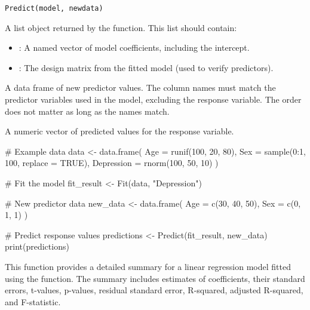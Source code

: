 \documentclass[a4paper]{book}
\begin{document}
%
\begin{Usage}
\begin{verbatim}
Predict(model, newdata)
\end{verbatim}
\end{Usage}
%
\begin{Arguments}
\begin{ldescription}
\item[\code{model}] A list object returned by the  function. This list should contain:
\begin{itemize}

\item{} : A named vector of model coefficients, including the intercept.
\item{} : The design matrix from the fitted model (used to verify predictors).

\end{itemize}


\item[\code{newdata}] A data frame of new predictor values. The column names must match the predictor variables
used in the model, excluding the response variable. The order does not matter as long as the names match.
\end{ldescription}
\end{Arguments}
%
\begin{Value}
A numeric vector of predicted values for the response variable.
\end{Value}
%
\begin{Examples}
\begin{ExampleCode}
# Example data
data <- data.frame(
  Age = runif(100, 20, 80),
  Sex = sample(0:1, 100, replace = TRUE),
  Depression = rnorm(100, 50, 10)
)

# Fit the model
fit_result <- Fit(data, "Depression")

# New predictor data
new_data <- data.frame(
  Age = c(30, 40, 50),
  Sex = c(0, 1, 1) 
)

# Predict response values
predictions <- Predict(fit_result, new_data)
print(predictions)
\end{ExampleCode}
\end{Examples}
%
\begin{Description}
This function provides a detailed summary for a linear regression model fitted using the  function.
The summary includes estimates of coefficients, their standard errors, t-values, p-values,
residual standard error, R-squared, adjusted R-squared, and F-statistic.
\end{Description}
\end{document}
